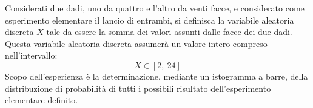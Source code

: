 Considerati due dadi, uno da quattro e l'altro da venti facce, e considerato come esperimento elementare il lancio di entrambi, si definisca la variabile aleatoria discreta $X$ tale da essere la somma dei valori assunti dalle facce dei due dadi. Questa variabile aleatoria discreta assumerà un valore intero compreso nell'intervallo:
\begin{equation}
	X\in[2,\ 24]
\end{equation}
Scopo dell'esperienza è la determinazione, mediante un istogramma a barre, della distribuzione di probabilità di tutti i possibili risultato dell'esperimento elementare definito.
